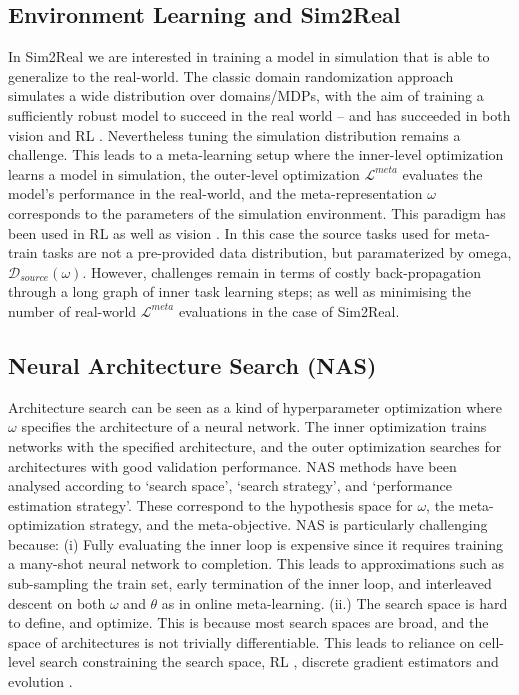 \documentclass[10pt,journal,compsoc]{IEEEtran}
\begin{document}
\subsection{Environment Learning and Sim2Real}\label{sec:sim2real}
In Sim2Real we are interested in training a model in simulation that is able to generalize to the real-world. The classic domain randomization approach simulates a wide distribution over domains/MDPs, with the aim of training a sufficiently robust model to succeed in the real world -- and has succeeded in both vision \cite{tremblay2018training} and RL \cite{openai2018learning}. Nevertheless tuning the simulation distribution remains a challenge. This leads to a meta-learning setup where the inner-level optimization learns a model in simulation, the outer-level optimization $\mathcal{L}^{meta}$ evaluates the model's performance in the real-world, and the meta-representation $\omega$ corresponds to the parameters of the simulation environment. This paradigm has been used in RL \cite{vuong2019howtorandomize} as well as vision \cite{ruiz2019learn2sim,kar2019metasim}. In this case the source tasks used for meta-train tasks are not a pre-provided data distribution, but paramaterized by omega, $\mathscr{D}_{source}(\omega)$. However, challenges remain in terms of costly back-propagation through a long graph of inner task learning steps; as well as minimising the number of real-world $\mathcal{L}^{meta}$ evaluations in the case of Sim2Real.




\subsection{Neural Architecture Search (NAS)} 
\label{subsec:nasApplication}
Architecture search \cite{stanley2019designing, liu2019darts, zoph2016neural, real2018regularized,elsken2019nas} can be seen as a kind of hyperparameter optimization where $\omega$ specifies the architecture of a neural network. The inner optimization trains networks with the specified architecture, and the outer optimization searches for architectures with good validation performance. NAS methods have been analysed \cite{elsken2019nas} according to `search space', `search strategy', and `performance estimation strategy'. These correspond to the hypothesis space for $\omega$, the meta-optimization strategy, and the meta-objective. NAS is particularly challenging because: (i) Fully evaluating the inner loop is expensive since it requires training a many-shot neural network to completion. This leads to approximations such as sub-sampling the train set, early termination of the inner loop, and interleaved descent on both $\omega$ and $\theta$ \cite{liu2019darts} as in online meta-learning. (ii.) The search space is hard to define, and optimize. This is because most search spaces are broad, and the space of architectures is not trivially differentiable. This leads to reliance on cell-level search \cite{zoph2016neural,liu2019darts} constraining the search space, RL \cite{zoph2016neural}, discrete gradient estimators \cite{xie2019snas} and evolution \cite{real2018regularized,stanley2019designing}.
\end{document}
